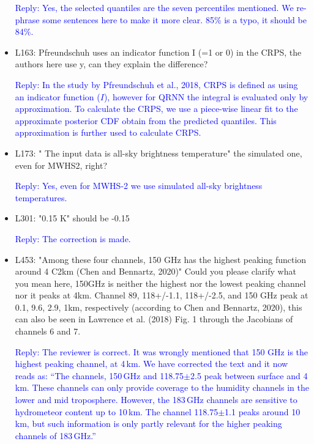 \documentclass[11pt,a4paper,draft]{article}
\begin{document}
\begin{itemize}
\textcolor{blue}{Reply: Yes, the selected quantiles are the seven percentiles mentioned. We re-phrase some sentences here to make it more clear. 85\% is a typo, it should be 84\%. }
		
		
\item	
		L163: Pfreundschuh uses an indicator function I (=1 or 0) in the CRPS, the authors
		here use y, can they explain the difference?
		
\textcolor{blue}{Reply: In the study by Pfreundschuh et al., 2018, CRPS is defined as using an indicator function ($I$), however for QRNN the integral is evaluated only by approximation. To calculate the CRPS, we use a piece-wise linear fit to the approximate posterior CDF obtain from the predicted quantiles. This approximation is further used to calculate CRPS. }
		
		
\item	
		L173: " The input data is all-sky brightness temperature" the simulated one, even for
		MWHS2, right?
		
\textcolor{blue}{Reply: Yes, even for MWHS-2 we use simulated all-sky brightness temperatures.}
		
		
\item	L301: "0.15 K" should be -0.15
		
\textcolor{blue}{Reply: The correction is made.} 
		
		
	
\item	
		L453: "Among these four channels, 150 GHz has the highest peaking function around 4
		C2km (Chen and Bennartz, 2020)" Could you please clarify what you mean here, 150GHz
		is neither the highest nor the lowest peaking channel nor it peaks at 4km. Channel 89,
		118+/-1.1, 118+/-2.5, and 150 GHz peak at 0.1, 9.6, 2.9, 1km, respectively (according
		to Chen and Bennartz, 2020), this can also be seen in Lawrence et al. (2018) Fig. 1
		through the Jacobians of channels 6 and 7.
	
\textcolor{blue}{Reply: The reviewer is correct. It was wrongly mentioned that 150 GHz is the highest peaking channel, at 4\,km. We have corrected the text and it now reads as:	
``The channels, 150\,GHz and 118.75$\pm$2.5 peak between surface and 4\,km. These channels can only provide coverage to the humidity channels in the lower and mid troposphere. However, the 183\,GHz channels are sensitive to hydrometeor content up to 10\,km. The channel 118.75$\pm$1.1 peaks around 10\,km, but such information is only partly relevant for the higher peaking channels of 183\,GHz.'' }


\end{itemize}
\end{document}
